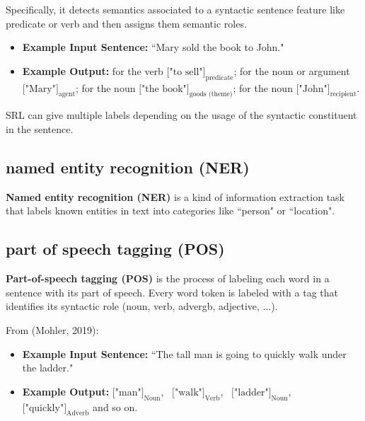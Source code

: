 Specifically, it detects semantics associated to a syntactic sentence feature like predicate or verb and then assigns them semantic roles. 
\begin{itemize}
    \item \textbf{Example Input Sentence: } ``Mary sold the book to John."
    
    \item \textbf{Example Output: } for the verb $\Big[ \text{"to sell"}\Big]_\text{predicate}$; for the noun or argument $\Big[ \text{"Mary"}\Big]_\text{agent}$; for the noun $\Big[ \text{"the book"}\Big]_\text{goods (theme)}$; for the noun $\Big[ \text{"John"}\Big]_\text{recipient}$.
\end{itemize}

SRL can give multiple labels depending on the usage of the syntactic constituent in the sentence. 



\subsection{named entity recognition (NER)} \label{nlptask:namedentityrecognitionNER}

\textbf{Named entity recognition (NER)} is a kind of information extraction task that labels known entities in text into categories like ``person" or ``location". 

\subsection{part of speech tagging (POS)} \label{nlptask:postagging}

\textbf{Part-of-speech tagging (POS)} is the process of labeling each word in a sentence with its part of speech. Every word token is labeled with a tag that identifies its syntactic role (noun, verb, advergb, adjective, ...).  

From (Mohler, 2019): 

\begin{itemize}
    \item \textbf{Example Input Sentence: } ``The tall man is going to quickly walk under the ladder."
    
    \item \textbf{Example Output: } $\Big[ \text{"man"}\Big]_\text{Noun}$, \ $\Big[ \text{"walk"}\Big]_\text{Verb}$, \ $\Big[ \text{"ladder"}\Big]_\text{Noun}$, \ $\Big[ \text{"quickly"}\Big]_\text{Adverb}$ and so on. 
\end{itemize}





